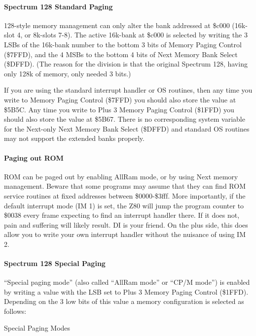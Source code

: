 \paragraph{Spectrum 128 Standard Paging}

128-style memory management can only alter the bank addressed at
\$c000 (16k-slot 4, or 8k-slots 7-8). The active 16k-bank at \$c000 is
selected by writing the 3 LSBs of the 16k-bank number to the bottom 3
bits of Memory Paging Control (\$7FFD), and the 4 MSBs to the bottom 4
bits of Next Memory Bank Select (\$DFFD). (The reason for the division
is that the original Spectrum 128, having only 128k of memory, only
needed 3 bits.)

If you are using the standard interrupt handler or OS routines, then
any time you write to Memory Paging Control (\$7FFD) you should also
store the value at \$5B5C. Any time you write to Plus 3 Memory Paging
Control (\$1FFD) you should also store the value at \$5B67. There is
no corresponding system variable for the Next-only Next Memory Bank
Select (\$DFFD) and standard OS routines may not support the extended
banks properly.

\paragraph{Paging out ROM}

ROM can be paged out by enabling AllRam mode, or by using Next memory
management. Beware that some programs may assume that they can find
ROM service routines at fixed addresses between \$0000-\$3fff. More
importantly, if the default interrupt mode (IM 1) is set, the Z80 will
jump the program counter to \$0038 every frame expecting to find an
interrupt handler there. If it does not, pain and suffering will
likely result. DI is your friend. On the plus side, this does allow
you to write your own interrupt handler without the nuisance of using
IM 2.

\paragraph{Spectrum 128 Special Paging}

``Special paging mode'' (also called ``AllRam mode'' or ``CP/M mode'')
is enabled by writing a value with the LSB set to Plus 3 Memory Paging
Control (\$1FFD). Depending on the 3 low bits of this value a memory
configuration is selected as follows:

\begin{table}[h]\centering
  \caption{Special Paging Modes}
\end{table}

